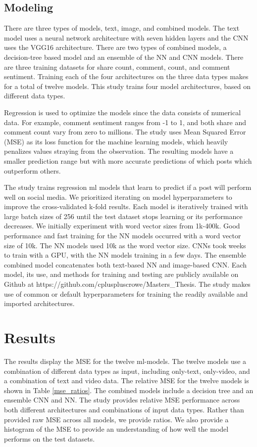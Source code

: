 \documentclass[mksc,blindrev]{informs3} %
\begin{document}
\subsection{Modeling}

There are three types of models, text, image, and combined models. The text model uses a neural network architecture with seven hidden layers and the CNN uses the VGG16 architecture. There are two types of combined models, a decision-tree based model and an ensemble of the NN and CNN models. There are three training datasets for share count, comment, count, and comment sentiment. Training each of the four architectures on the three data types makes for a total of twelve models. This study trains four model architectures, based on different data types.

Regression is used to optimize the models since the data consists of numerical data. For example, comment sentiment ranges from -1 to 1, and both share and comment count vary from zero to millions. The study uses Mean Squared Error (MSE) as its loss function for the machine learning models, which heavily penalizes values straying from the observation. The resulting models have a smaller prediction range but with more accurate predictions of which posts which outperform others.

The study trains regression ml models that learn to predict if a post will perform well on social media. We prioritized iterating on model hyperparameters to improve the cross-validated k-fold results. Each model is iteratively trained with large batch sizes of 256 until the test dataset stops learning or its performance decreases. We initially experiment with word vector sizes from 1k-400k. Good performance and fast training for the NN models occurred with a word vector size of 10k. The NN models used 10k as the word vector size. CNNs took weeks to train with a GPU, with the NN models training in a few days. The ensemble combined model concatenates both text-based NN and image-based CNN. Each model, its use, and methods for training and testing are publicly available on Github at https://github.com/cpluspluscrowe/Masters\_Thesis. The study makes use of common or default hyperparameters for training the readily available and imported architectures.

\section{Results}

The results display the MSE for the twelve ml-models. The twelve models use a combination of different data types as input, including only-text, only-video, and a combination of text and video data. The relative MSE for the twelve models is shown in Table \ref{mse_ratios}. The combined models include a decision tree and an ensemble CNN and NN. The study provides relative MSE performance across both different architectures and combinations of input data types. Rather than provided raw MSE across all models, we provide ratios.  We also provide a histogram of the MSE to provide an understanding of how well the model performs on the test datasets.
\end{document}
